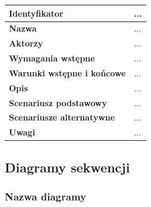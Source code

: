 \documentclass[11pt,oneside,a4paper,titlepage,onecolumn]{article}
\begin{document}
\begin{tabular}{ | l | l | }
	\hline
		\textbf{Identyfikator} & 
	...
		\\
		
	\hline
		\textbf{Nazwa} & \parbox[t]{13cm}{
			...
		}\\

	\hline
	
		\textbf{Aktorzy} & \parbox[t]{13cm}{
			...
		}\\

	\hline
	
		\textbf{Wymagania wstępne} & \parbox[t]{13cm}{
			...
		}\\

	\hline
	
		\textbf{Warunki wstępne i końcowe} & \parbox[t]{13cm}{
			...
		}\\
	
	\hline
	
		\textbf{Opis} & \parbox[t]{13cm}{
			...
		}\\
		
		\hline
	
		\textbf{Scenariusz podstawowy} & \parbox[t]{13cm}{
			...
		}\\
		
		\hline
	
		\textbf{Scenariusze alternatywne} & \parbox[t]{13cm}{
			...
		}\\
		
		\hline
	
		\textbf{Uwagi} & \parbox[t]{13cm}{
			...
		}\\
	
	\hline
\end{tabular}

\subsection{Diagramy sekwencji}

\subsubsection{Nazwa diagramy}
\end{document}
